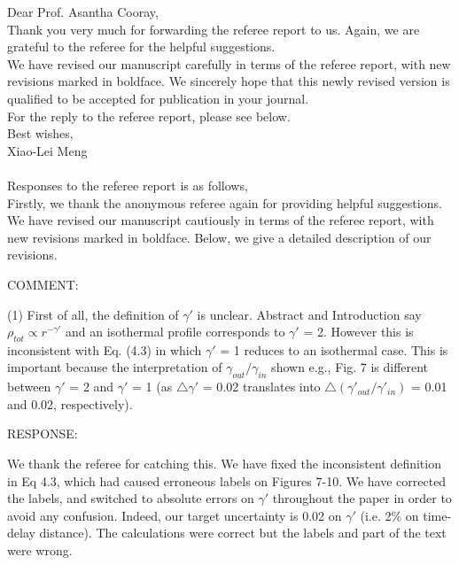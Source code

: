\documentclass[a4paper,11pt]{article}
\begin{document}
Dear Prof. Asantha Cooray,
\\

Thank you very much for forwarding the referee report to us. Again, we are grateful to the referee for the helpful suggestions.
\\

We have revised our manuscript carefully in terms of the referee report, with new revisions marked in boldface. We sincerely hope that this newly revised version is qualified to be accepted for publication in your journal.
\\

For the reply to the referee report, please see below.
\\

Best wishes,
\\

Xiao-Lei Meng
\\
\\

Responses to the referee report is as follows,
\\

Firstly, we thank the anonymous referee again for providing helpful
suggestions. We have revised our manuscript cautiously in terms of the
referee report, with new revisions marked in boldface. Below, we give
a detailed description of our revisions.

COMMENT:

(1) First of all, the definition of $\gamma'$ is unclear. Abstract and
Introduction say $\rho_{tot} \propto r^{-\gamma'}$ and an isothermal
profile corresponds to $\gamma'$ = 2. However this is inconsistent
with Eq. (4.3) in which $\gamma'$ = 1 reduces to an isothermal
case. This is important because the interpretation of
$\gamma_{out}/\gamma_{in}$ shown e.g., Fig. 7 is different between
$\gamma'$ = 2 and $\gamma'$ = 1 (as $\bigtriangleup \gamma'$ = 0.02
translates into $\bigtriangleup (\gamma'_{out}/\gamma'_{in})$ = 0.01
and 0.02, respectively).

RESPONSE:

We thank the referee for catching this. We have fixed the inconsistent
definition in Eq 4.3, which had caused erroneous labels on Figures
7-10. We have corrected the labels, and switched to absolute errors on
$\gamma'$ throughout the paper in order to avoid any
confusion. Indeed, our target uncertainty is 0.02 on $\gamma'$
(i.e. 2\% on time-delay distance). The calculations were correct but
the labels and part of the text were wrong.
\end{document}
